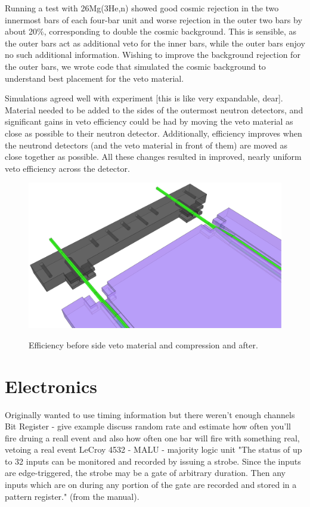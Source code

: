 Running a test with 26Mg(3He,n) showed good cosmic rejection in the two innermost bars of each four-bar unit and worse rejection in the outer two bars by about 20\%, corresponding to double the cosmic background.  This is sensible, as the outer bars act as additional veto for the inner bars, while the outer bars enjoy no such additional information.  Wishing to improve the background rejection for the outer bars, we wrote code that simulated the cosmic background to understand best placement for the veto material.

Simulations agreed well with experiment [this is like very expandable, dear].  Material needed to be added to the sides of the outermost neutron detectors, and significant gains in veto efficiency could be had by moving the veto material as close as possible to their neutron detector.  Additionally, efficiency improves when the neutrond detectors (and the veto material in front of them) are moved as close together as possible.  All these changes resulted in improved, nearly uniform veto efficiency across the detector.

\begin{figure}[ht]
\centering
\includegraphics[width=1.0\textwidth]{figures/veto_assembly.eps}
\label{fig:compareEfficiency}
\caption{Efficiency before side veto material and compression and after.}
\end{figure}

\section{Electronics}
Originally wanted to use timing information but there weren't enough channels
Bit Register - give example
discuss random rate and estimate how often you'll fire druing a reall event and also how often one bar will fire with something real, vetoing a real event
LeCroy 4532 - MALU - majority logic unit "The status of up to 32 inputs can be monitored and recorded by issuing a strobe.  Since the inputs are edge-triggered, the strobe may be a gate of arbitrary duration.  Then any inputs which are on during any portion of the gate are recorded and stored in a pattern register." (from the manual).

